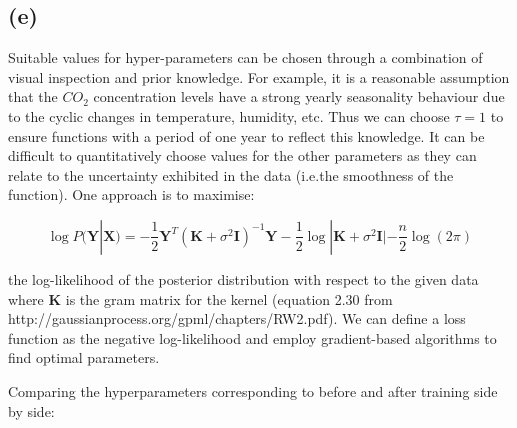 \documentclass[12pt]{article}
\begin{document}
\subsection*{(e)}
Suitable values for hyper-parameters can be chosen through a combination of visual inspection and prior knowledge.
For example, it is a reasonable assumption that the $CO_2$ concentration levels have a strong yearly seasonality behaviour due to the cyclic changes in temperature, humidity, etc.
Thus we can choose $\tau=1$ to ensure functions with a period of one year to reflect this knowledge.
It can be difficult to quantitatively choose values for the other parameters as they can relate to the uncertainty exhibited in the data (i.e.the smoothness of the function).
One approach is to maximise:

\[\log P(\textbf{Y} | \textbf{X}) = -\frac{1}{2} \textbf{Y}^T (\textbf{K} + \sigma^2\textbf{I})^{-1} \textbf{Y} - \frac{1}{2} \log |\textbf{K}+ \sigma^2\textbf{I}| - \frac{n}{2}\log(2\pi)\]

the log-likelihood  of the posterior distribution with respect to the given data where $\textbf{K}$ is the gram matrix for the kernel (equation 2.30 from http://gaussianprocess.org/gpml/chapters/RW2.pdf).
We can define a loss function as the negative log-likelihood and employ gradient-based algorithms to find optimal parameters.

Comparing the hyperparameters corresponding to before and after training side by side:
\end{document}

